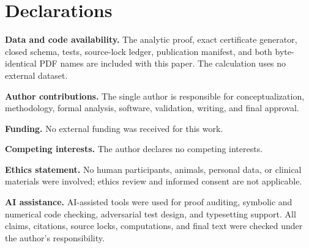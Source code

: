 \documentclass[11pt]{article}
\theoremstyle{definition}
\theoremstyle{remark}
\begin{document}
\section*{Declarations}

\noindent\textbf{Data and code availability.}
The analytic proof, exact certificate generator, closed schema, tests,
source-lock ledger, publication manifest, and both byte-identical PDF names
are included with this paper.  The calculation uses no external dataset.

\noindent\textbf{Author contributions.}
The single author is responsible for conceptualization, methodology,
formal analysis, software, validation, writing, and final approval.

\noindent\textbf{Funding.}
No external funding was received for this work.

\noindent\textbf{Competing interests.}
The author declares no competing interests.

\noindent\textbf{Ethics statement.}
No human participants, animals, personal data, or clinical materials were
involved; ethics review and informed consent are not applicable.

\noindent\textbf{AI assistance.}
AI-assisted tools were used for proof auditing, symbolic and numerical code
checking, adversarial test design, and typesetting support.  All claims,
citations, source locks, computations, and final text were checked under the
author's responsibility.

\begingroup
\small


\endgroup
\end{document}
